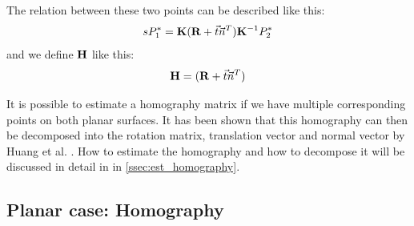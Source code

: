 The relation between these two points can be described like this:
\begin{equation}
    sP^*_1 =   \mathbf{K}(\mathbf{R} + \vec t\vec n^T)\mathbf{K}^{-1}P^*_2
\end{equation}
and we define $\mathbf{H}$ like this:
\begin{equation} \label{eq:homography}
    \mathbf{H} = (\mathbf{R} + \vec t\vec n^T)
\end{equation}

It is possible to estimate a homography matrix if we have multiple corresponding points on both planar surfaces. It has been shown that this homography can then be decomposed into the rotation matrix, translation vector and normal vector by Huang et al. \cite{506592e3b5484e57928e215df49a83cb}. How to estimate the homography and how to decompose it will be discussed in detail in in \autoref{ssec:est_homography}.

\subsection{Planar case: Homography}\label{ssec:est_homography}

